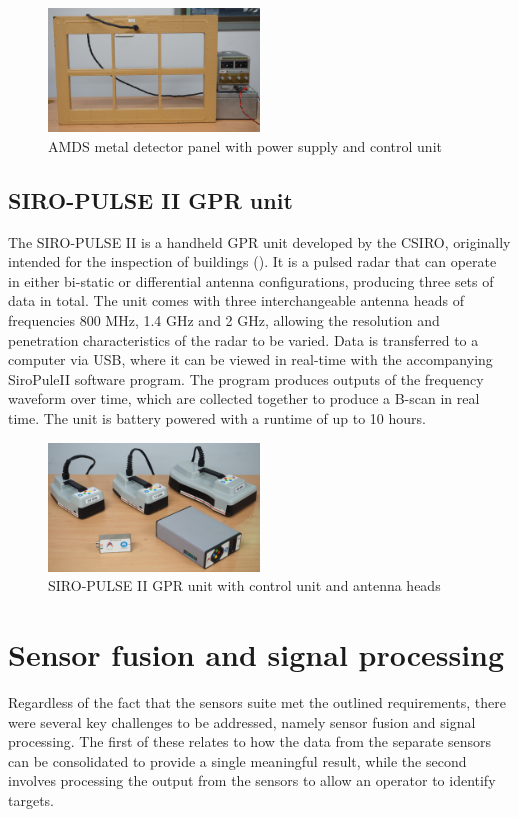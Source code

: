 \documentclass[main.tex]{subfiles}
\begin{document}
\begin{figure}[ht]
\includegraphics[width=0.5\textwidth]{3-ConceptDesign/AMDS.JPG}
\centering
\caption{AMDS metal detector panel with power supply and control unit} 
\end{figure}

\subsection{SIRO-PULSE II GPR unit}
The SIRO-PULSE II is a handheld GPR unit developed by the CSIRO, originally intended for the inspection of buildings (). It is a pulsed radar that can operate in either bi-static or differential antenna configurations, producing three sets of data in total. The unit comes with three interchangeable antenna heads of frequencies 800 MHz, 1.4 GHz and 2 GHz, allowing the resolution and penetration characteristics of the radar to be varied. Data is transferred to a computer via USB, where it can be viewed in real-time with the accompanying SiroPuleII software program. The program produces outputs of the frequency waveform over time, which are collected together to produce a B-scan in real time. The unit is battery powered with a runtime of up to 10 hours. 

\begin{figure}[ht]
\includegraphics[width=0.5\textwidth]{3-ConceptDesign/SiroPulse.JPG}
\centering
\caption{SIRO-PULSE II GPR unit with control unit and antenna heads} 
\end{figure}

\section{Sensor fusion and signal processing}
Regardless of the fact that the sensors suite met the outlined requirements, there were several key challenges to be addressed, namely sensor fusion and signal processing. The first of these relates to how the data from the separate sensors can be consolidated to provide a single meaningful result, while the second involves processing the output from the sensors to allow an operator to identify targets. 
\end{document}
